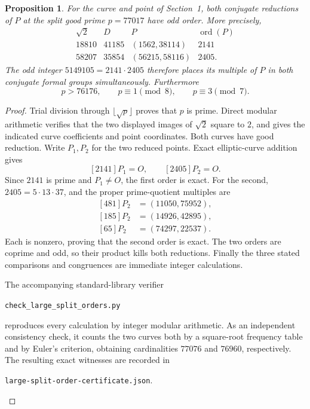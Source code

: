 \documentclass[11pt,a4paper]{article}
\newtheorem{proposition}[theorem]{Proposition}
\theoremstyle{remark}\newtheorem{remark}[theorem]{Remark}
\begin{document}
\begin{proposition}\label{prop:odd-example}
For the curve and point of Section~1, both conjugate reductions
of $P$ at the split good prime $p=77017$ have odd order.  More precisely,
\[
\begin{array}{c|c|c|r}
 \sqrt2&D&P&\operatorname{ord}(P)\\\hline
 18810&41185&(1562,38114)&2141\\
 58207&35854&(56215,58116)&2405.
\end{array}
\]
The odd integer $5149105=2141\cdot2405$ therefore places its
multiple of $P$ in both conjugate formal groups simultaneously.
Furthermore
\[
             p>76176,\qquad p\equiv1\pmod8,
             \qquad p\equiv3\pmod7.
\]
\end{proposition}
\begin{proof}
Trial division through $\lfloor\sqrt p\rfloor$ proves that $p$ is
prime.  Direct modular arithmetic verifies that the two displayed
images of $\sqrt2$ square to $2$, and gives the indicated curve
coefficients and point coordinates.  Both curves have good reduction.
Write $P_1,P_2$ for the two reduced points.  Exact elliptic-curve
addition gives
\[
                  [2141]P_1=O,\qquad [2405]P_2=O.
\]
Since $2141$ is prime and $P_1\ne O$, the first order is exact.
For the second, $2405=5\cdot13\cdot37$, and the proper prime-quotient
multiples are
\[
 \begin{aligned}
 [481]P_2&=(11050,75952),\\
 [185]P_2&=(14926,42895),\\
 [65]P_2&=(74297,22537).
 \end{aligned}
\]
Each is nonzero, proving that the second order is exact.
The two orders are coprime and odd, so their product kills both
reductions.  Finally the three stated comparisons and congruences
are immediate integer calculations.

The accompanying standard-library verifier
\begin{center}\small
\nolinkurl{check_large_split_orders.py}
\end{center}
reproduces every calculation by integer modular arithmetic.  As an
independent consistency check, it counts the two curves both by a
square-root frequency table and by Euler's criterion, obtaining
cardinalities $77076$ and $76960$, respectively.  The resulting
exact witnesses are recorded in
\begin{center}\small
\nolinkurl{large-split-order-certificate.json}.
\end{center}
\end{proof}
\end{document}
